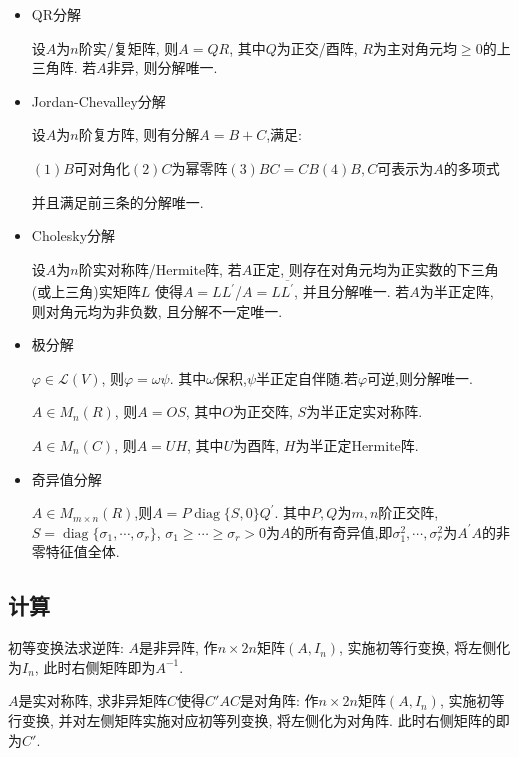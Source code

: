 \documentclass[UTF8]{ctexart}
\begin{document}
\begin{itemize}

	\item QR分解\par
	      设$A$为$n$阶实/复矩阵, 则$A=QR$, 其中$Q$为正交/酉阵, $R$为主对角元均$\geq 0$的上三角阵. 若$A$非异, 则分解唯一.

	\item Jordan-Chevalley分解\par
	      设$A$为$n$阶复方阵, 则有分解$A=B+C$,满足:\par
	      $(1)$$B$可对角化\qquad $(2)$$C$为幂零阵\qquad $(3)$$BC=CB$\qquad $(4)$$B,C$可表示为$A$的多项式\par
	      并且满足前三条的分解唯一.

	\item Cholesky分解\par
	      设$A$为$n$阶实对称阵/Hermite阵, 若$A$正定, 则存在对角元均为正实数的下三角(或上三角)实矩阵$L$
	      使得$A=LL^{\prime}$/$A=L\overline{L^{\prime}}$, 并且分解唯一.
	      若$A$为半正定阵, 则对角元均为非负数, 且分解不一定唯一.

	\item 极分解\par
	      $\varphi \in \mathcal{L}(V)$, 则$\varphi = \omega\psi$. 其中$\omega$保积,$\psi$半正定自伴随.若$\varphi $可逆,则分解唯一. \par
	      $A\in M_n(R)$, 则$A=OS$, 其中$O$为正交阵, $S$为半正定实对称阵.\par
	      $A\in M_n(C)$, 则$A=UH$, 其中$U$为酉阵, $H$为半正定Hermite阵.

	\item 奇异值分解\par
	      $A\in M_{m\times n}(R)$,则$A=P \operatorname{diag}\{S,0\}Q^{\prime}$.
	      其中$P,Q$为$m,n$阶正交阵,$S=\operatorname{diag}\{\sigma_1,\cdots ,\sigma_r\}$,
	      $\sigma_1\geq \cdots \geq \sigma_r>0$为$A$的所有奇异值,即$\sigma_1^2,\cdots,\sigma_r^2$为$A^{\prime}A$的非零特征值全体.

\end{itemize}


\subsection{计算}

初等变换法求逆阵: $A$是非异阵, 作$n\times 2n$矩阵$(A, I_n)$, 实施初等行变换,
将左侧化为$I_n$, 此时右侧矩阵即为$A^{-1}$.

$A$是实对称阵, 求非异矩阵$C$使得$C'AC$是对角阵:
作$n\times 2n$矩阵$(A, I_n)$, 实施初等行变换, 并对左侧矩阵实施对应初等列变换,
将左侧化为对角阵. 此时右侧矩阵的即为$C'$.
\end{document}
